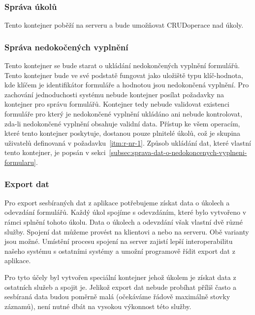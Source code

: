 \subsubsection{Správa úkolů}\label{subsubsec:sprava-ukolu}

Tento kontejner poběží na serveru a bude umožňovat CRUD\footnotemark[\value{footnote}] operace nad úkoly.


\subsubsection{Správa nedokočených vyplnění}\label{subsubsec:sprava-nedokoncenych-vyplneni}

Tento kontejner se bude starat o ukládání nedokončených vyplnění formulářů.
Tento kontejner bude ve své podstatě fungovat jako uložiště typu klíč-hodnota, kde klíčem je identifikátor formuláře a hodnotou jsou nedokončená vyplnění.
Pro zachování jednoduchosti systému nebude kontejner posílat požadavky na kontejner pro správu formulářů.
Kontejner tedy nebude validovat existenci formuláře pro který je nedokončené vyplnění ukládáno ani nebude kontrolovat, zda-li nedokončené vyplnění obsahuje validní data.
Přístup ke všem operacím, které tento kontejner poskytuje, dostanou pouze plnitelé úkolů, což je skupina uživatelů definovaná v požadavku~\ref{itm:r-nr-1}.
Způsob ukládání dat, které vlastní tento kontejner, je popsán v sekci~\ref{subsec:sprava-dat-o-nedokoncenych-vyplneni-formularu}.

\subsubsection{Export dat}\label{subsubsec:export-dat}

Pro export sesbíraných dat z aplikace potřebujeme získat data o úkolech a odevzdání formulářů.
Každý úkol spojíme s odevzdáním, které bylo vytvořeno v rámci splnění tohoto úkolu.
Data o úkolech a odevzdání však vlastní dvě různé služby.
Spojení dat můžeme provést na klientovi a nebo na serveru.
Obě varianty jsou možné.
Umístění procesu spojení na server zajistí lepší interoperabilitu našeho systému s ostatními systémy a umožní programově řídit export dat z aplikace.

Pro tyto účely byl vytvořen speciální kontejner jehož úkolem je získat data z ostatních služeb a spojit je.
Jelikož export dat nebude probíhat příliš často a sesbíraná data budou poměrně malá (očekáváme řádově maximálně stovky záznamů), není nutné dbát na vysokou výkonnost této služby.

